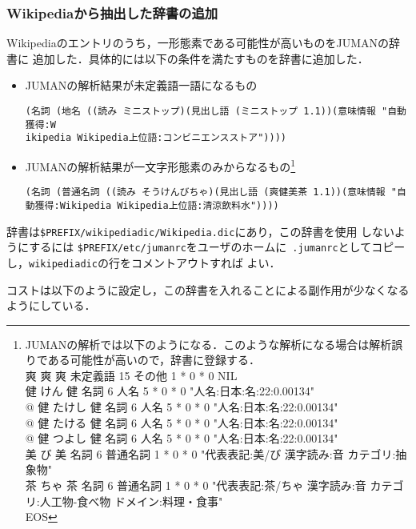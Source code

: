 \documentclass[a4j,titlepage]{jarticle}
\begin{document}
\subsubsection{Wikipediaから抽出した辞書の追加}

Wikipediaのエントリのうち，一形態素である可能性が高いものをJUMANの辞書に
追加した．具体的には以下の条件を満たすものを辞書に追加した．

\begin{itemize}
 \item JUMANの解析結果が未定義語一語になるもの
\begin{verbatim}
(名詞 (地名 ((読み ミニストップ)(見出し語 (ミニストップ 1.1))(意味情報 "自動獲得:W
ikipedia Wikipedia上位語:コンビニエンスストア"))))
\end{verbatim}
 \item JUMANの解析結果が一文字形態素のみからなるもの\footnote{JUMANの解析では以下のようになる．このような解析になる場合は解析誤りである可能性が高いので，辞書に登録する．\\
爽 爽 爽 未定義語 15 その他 1 * 0 * 0 NIL\\
健 けん 健 名詞 6 人名 5 * 0 * 0 "人名:日本:名:22:0.00134"\\
@ 健 たけし 健 名詞 6 人名 5 * 0 * 0 "人名:日本:名:22:0.00134"\\
@ 健 たける 健 名詞 6 人名 5 * 0 * 0 "人名:日本:名:22:0.00134"\\
@ 健 つよし 健 名詞 6 人名 5 * 0 * 0 "人名:日本:名:22:0.00134"\\
美 び 美 名詞 6 普通名詞 1 * 0 * 0 "代表表記:美/び 漢字読み:音 カテゴリ:抽象物"\\
茶 ちゃ 茶 名詞 6 普通名詞 1 * 0 * 0 "代表表記:茶/ちゃ 漢字読み:音 カテゴリ:人工物-食べ物 ドメイン:料理・食事"\\
EOS
}
\begin{verbatim}
(名詞 (普通名詞 ((読み そうけんびちゃ)(見出し語 (爽健美茶 1.1))(意味情報 "自動獲得:Wikipedia Wikipedia上位語:清涼飲料水"))))
\end{verbatim}
\end{itemize}

辞書は\texttt{\$PREFIX/wikipediadic/Wikipedia.dic}にあり，この辞書を使用
しないようにするには
\texttt{\$PREFIX/etc/jumanrc}をユーザのホームに{\tt
.jumanrc}としてコピーし，\texttt{wikipediadic}の行をコメントアウトすれば
よい．

コストは以下のように設定し，この辞書を入れることによる副作用が少なくなる
ようにしている．
\end{document}
